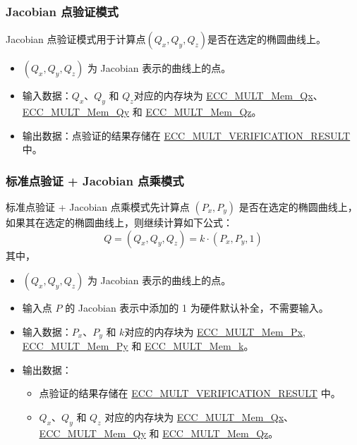 \documentclass[main\_\_CN.tex]{subfiles}
\begin{document}
\subsubsection{Jacobian 点验证模式}

Jacobian 点验证模式用于计算点$(Q_x,Q_y,Q_z)$是否在选定的椭圆曲线上。
\begin{itemize}
    \item $(Q_x,Q_y,Q_z)$ 为 Jacobian 表示的曲线上的点。
    \item 输入数据：$Q_x$、$Q_y$ 和 $Q_z$对应的内存块为 \hyperref[tab:ecc-memory]{ECC\_MULT\_Mem\_Qx}、\hyperref[tab:ecc-memory]{ECC\_MULT\_Mem\_Qy} 和 \hyperref[tab:ecc-memory]{ECC\_MULT\_Mem\_Qz}。
    \item 输出数据：点验证的结果存储在 \hyperref[fielddesc:ECCMULTVERIFICATIONRESULT]{ECC\_MULT\_VERIFICATION\_RESULT} 中。
\end{itemize}

\subsubsection{标准点验证 + Jacobian 点乘模式}

标准点验证 + Jacobian 点乘模式先计算点 $(P_x,P_y)$ 是否在选定的椭圆曲线上，如果其在选定的椭圆曲线上，则继续计算如下公式：
\[
Q = (Q_x,Q_y,Q_z) = k \cdot (P_x,P_y,1)
\]
其中，
\begin{itemize}
    \item $(Q_x,Q_y,Q_z)$ 为 Jacobian 表示的曲线上的点。
    \item 输入点 $P$ 的 Jacobian 表示中添加的 1 为硬件默认补全，不需要输入。
    \item 输入数据：$P_x$、$P_y$ 和 $k$对应的内存块为 \hyperref[tab:ecc-memory]{ECC\_MULT\_Mem\_Px}, \hyperref[tab:ecc-memory]{ECC\_MULT\_Mem\_Py} 和 \hyperref[tab:ecc-memory]{ECC\_MULT\_Mem\_k}。
    \item 输出数据：
    \begin{itemize}
        \item 点验证的结果存储在 \hyperref[fielddesc:ECCMULTVERIFICATIONRESULT]{ECC\_MULT\_VERIFICATION\_RESULT} 中。
        \item $Q_x$、$Q_y$ 和 $Q_z$ 对应的内存块为 \hyperref[tab:ecc-memory]{ECC\_MULT\_Mem\_Qx}、\hyperref[tab:ecc-memory]{ECC\_MULT\_Mem\_Qy} 和 \hyperref[tab:ecc-memory]{ECC\_MULT\_Mem\_Qz}。
    \end{itemize}
\end{itemize}
\end{document}
